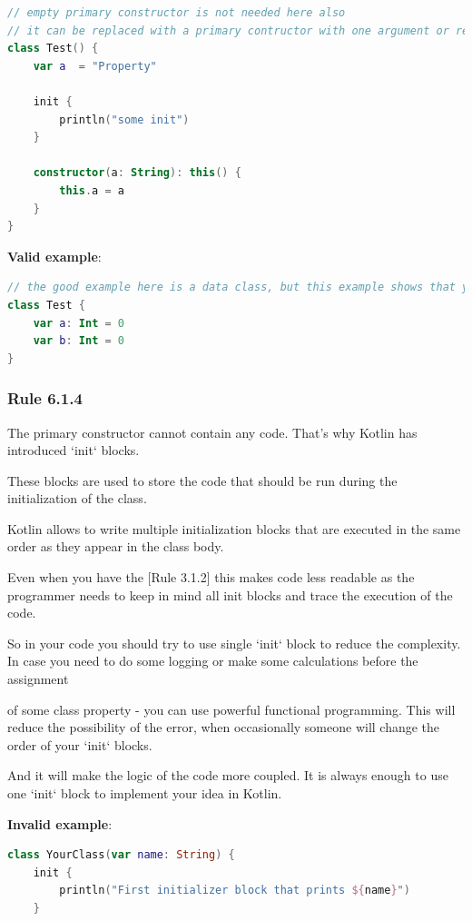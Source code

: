 {{{{\begin{lstlisting}[language=Kotlin]
// empty primary constructor is not needed here also
// it can be replaced with a primary contructor with one argument or removed
class Test() {
    var a  = "Property"

    init {
        println("some init")
    }

    constructor(a: String): this() {
        this.a = a
    }
}
\end{lstlisting}


\textbf{Valid example}:

\begin{lstlisting}[language=Kotlin]
// the good example here is a data class, but this example shows that you should get rid of braces for primary constructor
class Test {
    var a: Int = 0
    var b: Int = 0
}
\end{lstlisting}


\subsubsection*{\textbf{Rule 6.1.4}}
\leavevmode\newline

The primary constructor cannot contain any code. That's why Kotlin has introduced `init` blocks.

These blocks are used to store the code that should be run during the initialization of the class.

Kotlin allows to write multiple initialization blocks that are executed in the same order as they appear in the class body.

Even when you have the [Rule 3.1.2] this makes code less readable as the programmer needs to keep in mind all init blocks and trace the execution of the code.

So in your code you should try to use single `init` block to reduce the complexity. In case you need to do some logging or make some calculations before the assignment

of some class property - you can use powerful functional programming. This will reduce the possibility of the error, when occasionally someone will change the order of your `init` blocks.

And it will make the logic of the code more coupled. It is always enough to use one `init` block to implement your idea in Kotlin.



\textbf{Invalid example}:

\begin{lstlisting}[language=Kotlin]
class YourClass(var name: String) {
    init {
        println("First initializer block that prints ${name}")
    }


\end{lstlisting}}}}}
